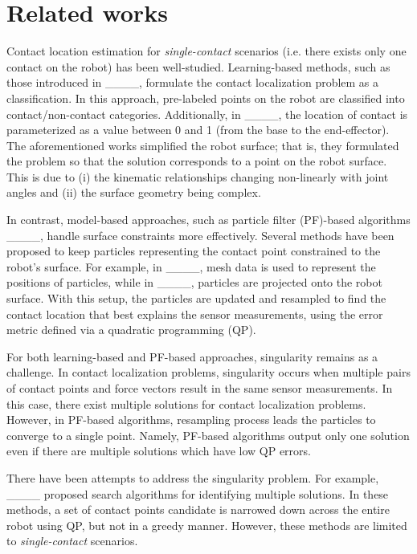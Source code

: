 \section{Related works}
Contact location estimation for \textit{single-contact} scenarios (i.e. there exists only one contact on the robot) has been well-studied.
Learning-based methods, such as those introduced in ____, formulate the contact localization problem as a classification. 
In this approach, pre-labeled points on the robot are classified into contact/non-contact categories.
Additionally, in ____, the location of contact is parameterized as a value between 0 and 1 (from the base to the end-effector).
The aforementioned works simplified the robot surface; that is, they formulated the problem so that the solution corresponds to a point on the robot surface. 
This is due to (i) the kinematic relationships changing non-linearly with joint angles and (ii) the surface geometry being complex.

In contrast, model-based approaches, such as particle filter (PF)-based algorithms ____, handle surface constraints more effectively. 
Several methods have been proposed to keep particles representing the contact point constrained to the robot's surface.
For example, in ____, mesh data is used to represent the positions of particles, while in ____, particles are projected onto the robot surface.
With this setup, the particles are updated and resampled to find the contact location that best explains the sensor measurements, using the error metric defined via a quadratic programming (QP).

For both learning-based and PF-based approaches, singularity remains as a challenge. 
In contact localization problems, singularity occurs when multiple pairs of contact points and force vectors result in the same sensor measurements.
In this case, there exist multiple solutions for contact localization problems.
However, in PF-based algorithms, resampling process leads the particles to converge to a single point. 
Namely, PF-based algorithms output only one solution even if there are multiple solutions which have low QP errors.

There have been attempts to address the singularity problem. 
For example, ____ proposed search algorithms for identifying multiple solutions.
In these methods, a set of contact points candidate is narrowed down across the entire robot using QP, but not in a greedy manner.
However, these methods are limited to \textit{single-contact} scenarios.

